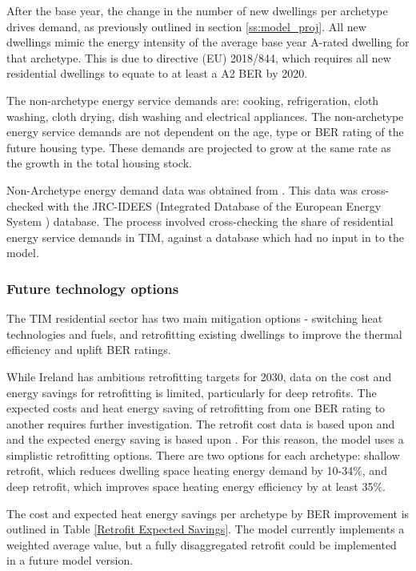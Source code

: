 \documentclass[gmd,manuscript]{copernicus}
\begin{document}
After the base year, the change in the number of new dwellings per archetype drives demand, as previously outlined in section \ref{ss:model_proj}. All new dwellings mimic the energy intensity of the average base year A-rated dwelling for that archetype. This is due to directive (EU) 2018/844, which requires all new residential dwellings to equate to at least a A2 BER by 2020. 

The non-archetype energy service demands are: cooking, refrigeration, cloth washing, cloth drying, dish washing and electrical appliances. The non-archetype energy service demands are not dependent on the age, type or BER rating of the future housing type. These demands are projected to grow at the same rate as the growth in the total housing stock. 

Non-Archetype energy demand data was obtained from \citet{SEAISustainableAuthorityofIreland2018}. This data was cross-checked with the JRC-IDEES (Integrated Database of the European Energy System ) database. The process involved cross-checking the share of residential energy service demands in TIM, against a database which had no input in to the model.

\subsubsection{Future technology options}
The TIM residential sector has two main mitigation options - switching heat technologies and fuels, and retrofitting existing dwellings to improve the thermal efficiency and uplift BER ratings. 

While Ireland has ambitious retrofitting targets for 2030, data on the cost and energy savings for retrofitting is limited, particularly for deep retrofits. The expected costs and heat energy saving of retrofitting from one BER rating to another requires further investigation. The retrofit cost data is based upon \citet{AECOMDECLG2013} and \citet{Ali2020} and the expected energy saving is based upon \citet{Collins2017b}. For this reason, the model uses a simplistic retrofitting options. There are two options for each archetype: shallow retrofit, which reduces dwelling space heating energy demand by 10-34\%, and deep retrofit, which improves space heating energy efficiency by at least 35\%. 

The cost and expected heat energy savings per archetype by BER improvement is outlined in Table \ref{Retrofit Expected Savings}. The model currently implements a weighted average value, but a fully disaggregated retrofit could be implemented in a future model version.
\end{document}
